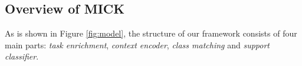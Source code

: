 \subsection{Overview of MICK}
\label{sec:structure}
As is shown in Figure \ref{fig:model},
the structure of our framework
consists of four main parts: {\em task enrichment}, {\em context encoder}, {\em class matching}
and {\em support classifier}.

